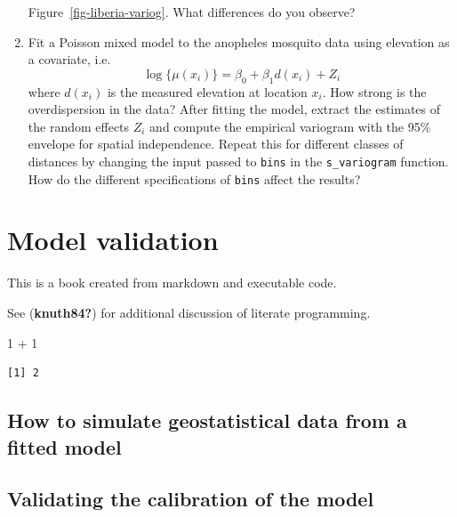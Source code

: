 \documentclass[
  letterpaper,
]{krantz}
\newenvironment{Shaded}{\begin{snugshade}}{\end{snugshade}}
\newcommand{\DecValTok}[1]{\textcolor[rgb]{0.68,0.00,0.00}{#1}}
\newcommand{\SpecialCharTok}[1]{\textcolor[rgb]{0.37,0.37,0.37}{#1}}
\begin{document}
\begin{enumerate}
  Figure~\ref{fig-liberia-variog}. What differences do you observe?
\item
  Fit a Poisson mixed model to the anopheles mosquito data using
  elevation as a covariate, i.e.~\[
  \log\{\mu(x_i)\} = \beta_{0} + \beta_{1} d(x_i) + Z_i
  \] where \(d(x_i)\) is the measured elevation at location \(x_i\). How
  strong is the overdispersion in the data? After fitting the model,
  extract the estimates of the random effects \(Z_i\) and compute the
  empirical variogram with the 95\% envelope for spatial independence.
  Repeat this for different classes of distances by changing the input
  passed to \texttt{bins} in the \texttt{s\_variogram} function. How do
  the different specifications of \texttt{bins} affect the results?
\end{enumerate}


\hypertarget{sec-validation}{%
\chapter{Model validation}\label{sec-validation}}

This is a book created from markdown and executable code.

See (\textbf{knuth84?}) for additional discussion of literate
programming.

\begin{Shaded}
\begin{Highlighting}[]
\DecValTok{1} \SpecialCharTok{+} \DecValTok{1}
\end{Highlighting}
\end{Shaded}

\begin{verbatim}
[1] 2
\end{verbatim}

\hypertarget{how-to-simulate-geostatistical-data-from-a-fitted-model}{%
\section{How to simulate geostatistical data from a fitted
model}\label{how-to-simulate-geostatistical-data-from-a-fitted-model}}

\hypertarget{validating-the-calibration-of-the-model}{%
\section{Validating the calibration of the
model}\label{validating-the-calibration-of-the-model}}
\end{document}
